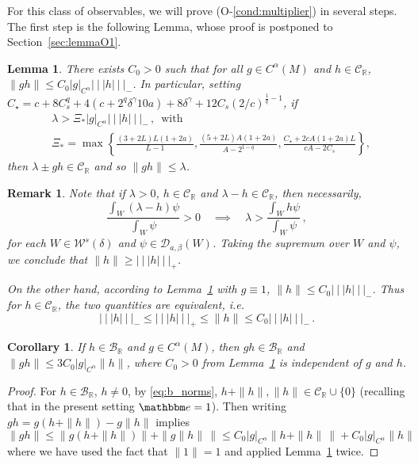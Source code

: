 \documentclass{amsart}
\numberwithin{equation}{section}
\newtheorem{lem}[thm]{Lemma}
\newtheorem{cor}[thm]{Corollary}
\newtheorem{rem}[thm]{Remark}
\newcommand\cB{{\mathcal B}}
\newcommand\cC{{\mathcal C}}
\newcommand\cD{{\mathcal D}}
\newcommand\cW{{\mathcal W}}
\newcommand\bR{{\mathbb R}}
\newcommand{\bbe}{\mathbbm e}
\newcommand{\tri}{{|\:\!\!|\:\!\!|}}
\begin{document}
For this class of observables, we will prove (O-\ref{cond:multiplier}) in several steps.  
The first step is the following Lemma, whose proof is postponed to Section~\ref{sec:lemmaO1}. 
\begin{lem}
\label{lem:norm est}
There exists $C_0>0$ such that for all $g \in C^\alpha(M)$ and $h \in \cC_\bR$,
$\| g h \| \le C_0 | g |_{C^\alpha} \tri h \tri_-$.
In particular, setting $C_\star = c + 8 C_s^q + 4(c + 2^q \delta^\gamma 10 a) + 8 \delta^\gamma + 12 C_s (2/c)^{\frac{1}{q} -1}$, if
\begin{equation}
\label{eq:lambda bound}
\begin{split}
&\lambda >\Xi_* |g|_{C^\alpha} \tri h \tri_- \, , \, \mbox{ with } \\
&\Xi_*= \max \left\{ \frac{(3+2L)L(1+2a)}{L-1},  \frac{(5+2L) A(1+2a)}{A-2^{1-q}}  , \frac{ C_\star + 2cA(1+2a)L }{cA - 2C_s} \right\},
\end{split}
\end{equation}
then $\lambda \pm gh \in \cC_\bR$ and so $\| gh \| \le \lambda$.
\end{lem}

\begin{rem}
\label{rem:equiv tri}
Note that if $\lambda >0$, $h \in \cC_{\bR}$ and $\lambda - h \in \cC_\bR$, then necessarily,
\[
\frac{ \int_W (\lambda - h) \psi}{\int_W \psi} > 0 \quad \implies \quad \lambda > \frac{ \int_W h \psi}{\int_W \psi} \, , 
\]
for each $W \in \cW^s(\delta)$ and $\psi \in \cD_{a,\beta}(W)$.  Taking the supremum over $W$ and $\psi$, we
conclude that $\| h \| \ge \tri h \tri_+$.

On the other hand, according to Lemma~\ref{lem:norm est} with $g \equiv 1$, $\| h \| \le C_0 \tri h \tri_-$.  Thus
for $h \in \cC_{\bR}$, the two quantities are equivalent, i.e.
\[
\tri h \tri_- \le \tri h \tri_+ \le \|h \| \le C_0 \tri h \tri_- \, .
\] 
\end{rem}

\begin{cor}
\label{cor:in space}
If $h \in \cB_{\bR}$ and $g \in C^\alpha(M)$, then $gh \in \cB_{\bR}$ and $\| gh\| \le 3C_0 |g|_{C^\alpha} \|h \|$, where $C_0>0$ from Lemma~\ref{lem:norm est} is independent of $g$ and $h$.
\end{cor}
\begin{proof}
For $h \in \cB_{\bR}$, $h \neq 0$, by \eqref{eq:b_norms}, $h + \| h \|, \| h \| \in \cC_{\bR} \cup \{ 0 \}$
(recalling that in the present setting $\bbe = 1$).  Then writing
$gh = g(h+\| h \|) - g\| h \|$ implies 
\[
\| gh \| \le \| g (h+\| h \|) \| + \| g \| h \| \, \| \leq C_0 |g|_{C^\alpha} \| h + \| h \| \, \| + C_0 |g|_{C^\alpha} \| h \|
\]
where we have used the fact that $\| 1\| =1$ and applied Lemma~\ref{lem:norm est} twice. 
\end{proof}
\end{document}
